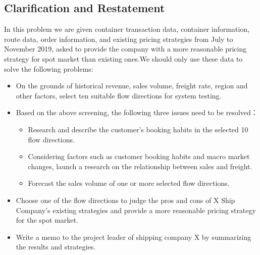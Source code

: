 \subsection{Clarification and Restatement}
In this problem we are given container transaction data, container information, route data, order information, and existing pricing strategies from July to November 2019, asked to provide the company with a more reasonable pricing strategy for spot market than existing ones.We should only use these data to solve the following problems:
\begin{itemize}
    \item  On the grounds of historical revenue, sales volume, freight rate, region and other factors, select ten suitable flow directions for system testing.
    \item Based on the above screening, the following three issues need to be resolved：
    \begin{itemize}
        \item[-]Research and describe the customer's booking habits in the selected 10 flow directions.
        \item[-]Considering factors such as customer booking habits and macro market changes, launch a research on the relationship between sales and freight.
        \item[-]Forecast the sales volume of one or more selected flow directions.
    \end{itemize}
    \item Choose one of the flow directions to judge the pros and cons of X Ship Company’s existing strategies and provide a more reasonable pricing strategy for the spot market.
    \item Write a memo to the project leader of shipping company X by summarizing the results and strategies.
\end{itemize}


